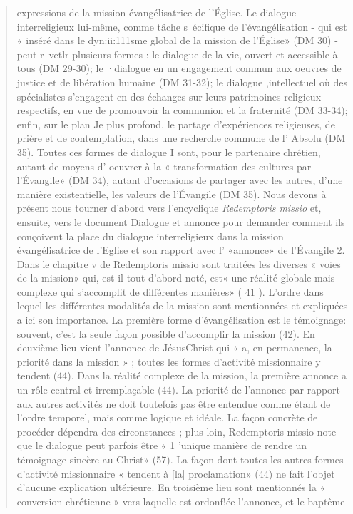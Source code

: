 \begin{quote}
expressions de la mission évangélisatrice de l'Église.
Le dialogue interreligieux lui-même, comme tâche s~écifique
de l'évangélisation - qui est « inséré dans le dyn:ii:111sme
global de la mission de l'Église» (DM 30) - peut r~vetlr plusieurs
formes : le dialogue de la vie, ouvert et accessible à tous
(DM 29-30); le ·dialogue en un engagement commun aux
oeuvres de justice et de libération humaine (DM 31-32); le
dialogue ,intellectuel où des spécialistes s'engagent en des
échanges sur leurs patrimoines religieux respectifs, en vue de
promouvoir la communion et la fraternité (DM 33-34); enfin,
sur le plan Je plus profond, le partage d'expériences religieuses,
de prière et de contemplation, dans une recherche commune
de l' Absolu (DM 35). Toutes ces formes de dialogue I sont,
pour le partenaire chrétien, autant de moyens d' oeuvrer à la
« transformation des cultures par l'Évangile» (DM 34), autant
d'occasions de partager avec les autres, d'une manière existentielle,
les valeurs de l'Évangile (DM 35).
Nous devons à présent nous tourner d'abord vers l'encyclique
\textit{Redemptoris missio } et, ensuite, vers le document Dialogue
et annonce pour demander comment ils conçoivent la
place du dialogue interreligieux dans la mission évangélisatrice
de l'Eglise et son rapport avec l' «annonce» de l'Évangile 2.
Dans le chapitre v de Redemptoris missio sont traitées les
diverses « voies de la mission» qui, est-il tout d'abord noté,
est« une réalité globale mais complexe qui s'accomplit de différentes
manières» ( 41 ). L'ordre dans lequel les différentes
modalités de la mission sont mentionnées et expliquées a ici
son importance. La première forme d'évangélisation est le
témoignage: souvent, c'est la seule façon possible d'accomplir
la mission (42). En deuxième lieu vient l'annonce de JésusChrist
qui « a, en permanence, la priorité dans la mission » ;
toutes les formes d'activité missionnaire y tendent (44). Dans
la réalité complexe de la mission, la première annonce a un
rôle central et irremplaçable (44). La priorité de l'annonce par
rapport aux autres activités ne doit toutefois pas être entendue
comme étant de l'ordre temporel, mais comme logique et
idéale. La façon concrète de procéder dépendra des circonstances
; plus loin, Redemptoris missio note que le dialogue
peut parfois être « 1 'unique manière de rendre un témoignage
sincère au Christ» (57). La façon dont toutes les autres formes
d'activité missionnaire « tendent à [la] proclamation» (44) ne
fait l'objet d'aucune explication ultérieure.
En troisième lieu sont mentionnés la « conversion chrétienne
» vers laquelle est ordonf!ée l'annonce, et le baptême

\end{quote}
